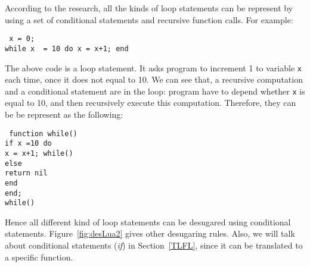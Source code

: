 According to the research, all the kinds of loop statements can be represent by using a set of conditional statements and recursive function calls. For example:
\begin{flushleft}
{\tt
x = 0;\\
while x ~= 10 do x = x+1; end
}
\end{flushleft}
The above code is a loop statement. It asks program to increment 1 to variable {\tt x} each time, once it does not equal to 10. We can see that, a recursive computation and a conditional statement are in the loop: program have to depend whether {\tt x} is equal to 10, and then recursively execute this computation. Therefore, they can be be represent as the following:
\begin{flushleft}
{\tt
function while()\\
\quad if x~=10 do\\
\quad\quad x = x+1; while()\\
\quad else\\
\quad\quad return nil\\
\quad end\\
end;\\
while()\\
}
\end{flushleft}
Hence all different kind of loop statements can be desugared using conditional statements. Figure~\ref{fig:desLua2} gives other desugaring rules. Also, we will talk about conditional statements ({\it if}) in Section~\ref{TLFL}, since it can be translated to a specific function.


